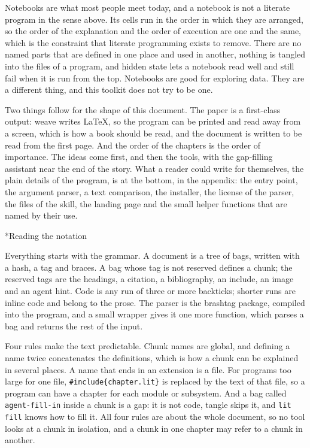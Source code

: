 \documentclass[10pt,a4paper]{article}
\makeatletter
\renewcommand\section{\@startsection{section}{1}{\z@}{-3.2ex \@plus -1ex \@minus -.2ex}{1.2ex \@plus .2ex}{\normalfont\LARGE\itshape}}
\newcounter{chunk}
\makeatother
\begin{document}
Notebooks are what most people meet today, and a notebook is not a literate program in the sense above. Its cells run in the order in which they are arranged, so the order of the explanation and the order of execution are one and the same, which is the constraint that literate programming exists to remove. There are no named parts that are defined in one place and used in another, nothing is tangled into the files of a program, and hidden state lets a notebook read well and still fail when it is run from the top. Notebooks are good for exploring data. They are a different thing, and this toolkit does not try to be one.

Two things follow for the shape of this document. The paper is a first-class output: weave writes LaTeX, so the program can be printed and read away from a screen, which is how a book should be read, and the document is written to be read from the first page. And the order of the chapters is the order of importance. The ideas come first, and then the tools, with the gap-filling assistant near the end of the story. What a reader could write for themselves, the plain details of the program, is at the bottom, in the appendix: the entry point, the argument parser, a text comparison, the installer, the license of the parser, the files of the skill, the landing page and the small helper functions that are named by their use.

\hypertarget{h-Reading-the-notation}{}
\section*{Reading the notation}

Everything starts with the grammar. A document is a tree of bags, written with a hash, a tag and braces. A bag whose tag is not reserved defines a chunk; the reserved tags are the headings, a citation, a bibliography, an include, an image and an agent hint. Code is any run of three or more backticks; shorter runs are inline code and belong to the prose. The parser is the brashtag package, compiled into the program, and a small wrapper gives it one more function, which parses a bag and returns the rest of the input.

Four rules make the text predictable. Chunk names are global, and defining a name twice concatenates the definitions, which is how a chunk can be explained in several places. A name that ends in an extension is a file. For programs too large for one file, \texttt{\#include\{chapter.\allowbreak{}lit\}} is replaced by the text of that file, so a program can have a chapter for each module or subsystem. And a bag called \texttt{agent-fill-in} inside a chunk is a gap: it is not code, tangle skips it, and \texttt{lit fill} knows how to fill it. All four rules are about the whole document, so no tool looks at a chunk in isolation, and a chunk in one chapter may refer to a chunk in another.
\end{document}

